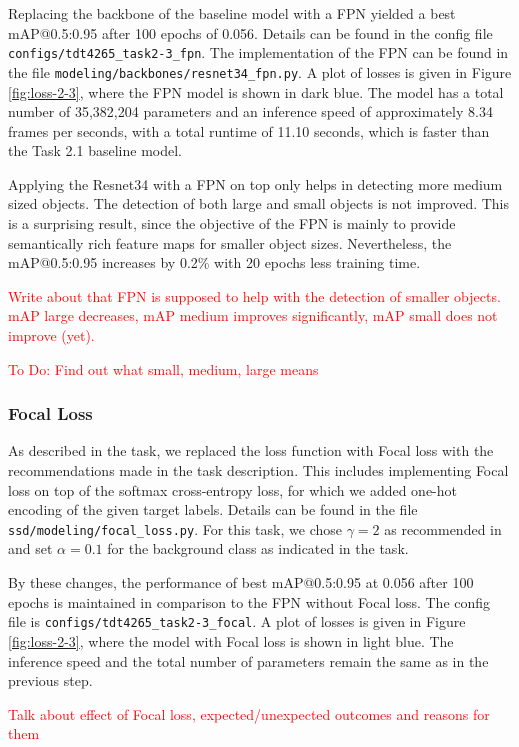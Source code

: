 \documentclass{article}
\begin{document}
Replacing the backbone of the baseline model with a FPN yielded a best mAP@0.5:0.95 after 100 epochs of 0.056. Details can be found in the config file \texttt{configs/tdt4265\_task2-3\_fpn}.  The implementation of the FPN can be found in the file \texttt{modeling/backbones/resnet34\_fpn.py}.  A plot of losses is given in Figure \ref{fig:loss-2-3}, where the FPN model is shown in dark blue. The model has a total number of 35,382,204 parameters and an inference speed of approximately 8.34 frames per seconds, with a total runtime of 11.10 seconds, which is faster than the Task 2.1 baseline model.

Applying the Resnet34 with a FPN on top only helps in detecting more medium sized objects. The detection of both large and small objects is not improved. This is a surprising result, since the objective of the FPN is mainly to provide semantically rich feature maps for smaller object sizes. Nevertheless, the mAP@0.5:0.95 increases by 0.2\% with 20 epochs less training time.

\textcolor{red}{Write about that FPN is supposed to help with the detection of smaller objects. mAP large decreases, mAP medium improves significantly, mAP small does not improve (yet).}

\textcolor{red}{To Do: Find out what small, medium, large means}

\subsubsection*{Focal Loss}
As described in the task, we replaced the loss function with Focal loss \cite{lin2017focal} with the recommendations made in the task description. This includes implementing Focal loss on top of the softmax cross-entropy loss, for which we added one-hot encoding of the given target labels. Details can be found in the file \texttt{ssd/modeling/focal\_loss.py}. For this task, we chose $\gamma = 2$ as recommended in \cite{lin2017focal} and set $\alpha = 0.1$ for the background class as indicated in the task. 

By these changes, the performance of best mAP@0.5:0.95 at 0.056 after 100 epochs is maintained in comparison to the FPN without Focal loss. The config file is \texttt{configs/tdt4265\_task2-3\_focal}. A plot of losses is given in Figure \ref{fig:loss-2-3}, where the model with Focal loss is shown in light blue. The inference speed and the total number of parameters remain the same as in the previous step.

\textcolor{red}{Talk about effect of Focal loss, expected/unexpected outcomes and reasons for them}
\end{document}
